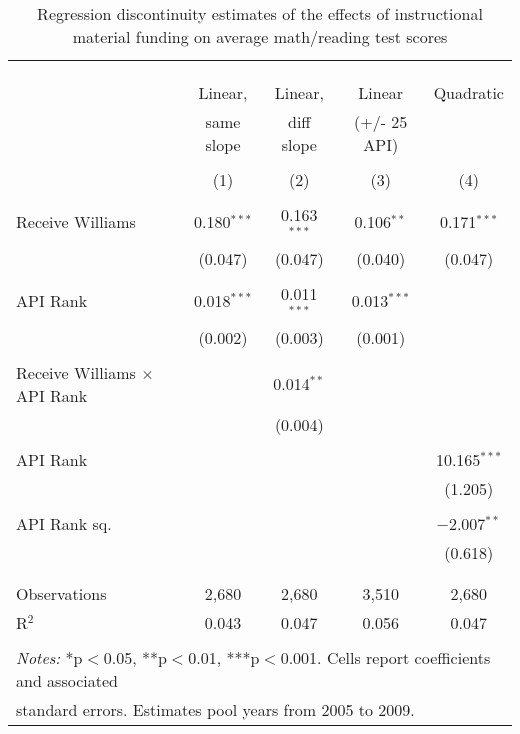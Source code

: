 
\begin{table}[!htbp] \centering 
  \caption{Regression discontinuity estimates of the effects of instructional material funding on average math/reading test scores} 
  \label{} 
\begin{tabular}{@{\extracolsep{5pt}}lcccc} 
\\[-1.8ex]\hline 
\hline \\[-1.8ex] 
\\[-1.8ex] & \multicolumn{4}{c}{} \\ 
 & Linear, 		& Linear, 		& Linear 		& Quadratic \\ 
& same slope 	& diff slope 	& (+/- 25 API) 	&			 \\ 
\\[-1.8ex] & (1) & (2) & (3) & (4)\\ 
\hline \\[-1.8ex] 
 Receive Williams & 0.180$^{***}$ & 0.163$^{***}$ & 0.106$^{**}$ & 0.171$^{***}$ \\ 
  & (0.047) & (0.047) & (0.040) & (0.047) \\ 
  & & & & \\ 
 API Rank & 0.018$^{***}$ & 0.011$^{***}$ & 0.013$^{***}$ &  \\ 
  & (0.002) & (0.003) & (0.001) &  \\ 
  & & & & \\ 
 Receive Williams $\times$ API Rank &  & 0.014$^{**}$ &  &  \\ 
  &  & (0.004) &  &  \\ 
  & & & & \\ 
 API Rank &  &  &  & 10.165$^{***}$ \\ 
  &  &  &  & (1.205) \\ 
  & & & & \\ 
 API Rank sq. &  &  &  & $-$2.007$^{**}$ \\ 
  &  &  &  & (0.618) \\ 
  & & & & \\ 
\hline \\[-1.8ex] 
Observations & 2,680 & 2,680 & 3,510 & 2,680 \\ 
R$^{2}$ & 0.043 & 0.047 & 0.056 & 0.047 \\ 
\hline 
\hline \\[-1.8ex] 
\multicolumn{5}{l}{\textit{Notes:} *p$<$0.05, **p$<$0.01, ***p$<$0.001. Cells report coefficients and associated} \\
\multicolumn{5}{l}{standard errors. Estimates pool years from 2005 to 2009.} \\ 
\end{tabular} 
\end{table} 
